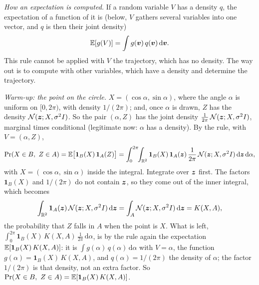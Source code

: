 \emph{How an expectation is computed.} If a random variable $V$ has a
density $q$, the expectation of a function of it is (below, $V$ gathers
several variables into one vector, and $q$ is then their joint density)
\[
  \mathbb{E}[g(V)]=\int g(\bm{v})\,q(\bm{v})\,\mathrm d\bm{v} .
\]
This rule cannot be applied with $V$ the trajectory, which has no
density. The way out is to compute with other variables, which have a
density and determine the trajectory.

\emph{Warm-up: the point on the circle.} $X=(\cos\alpha,\sin\alpha)$,
where the angle $\alpha$ is uniform on $[0,2\pi)$, with density
$1/(2\pi)$; and, once $\alpha$ is drawn, $Z$ has the density
$\mathcal{N}(\bm{z};X,\sigma^2I)$. So the pair $(\alpha,Z)$ has the joint
density $\frac1{2\pi}\,\mathcal{N}(\bm{z};X,\sigma^2I)$, marginal times
conditional (legitimate now: $\alpha$ has a density). By the rule, with
$V=(\alpha,Z)$,
\[
  \Pr(X\in B,\ Z\in A)=\mathbb{E}\bigl[\mathbf 1_B(X)\,\mathbf 1_A(Z)\bigr]
  =\int_0^{2\pi}\!\!\int_{\mathbb{R}^2}\mathbf 1_B(X)\,\mathbf 1_A(\bm{z})\,
   \frac1{2\pi}\,\mathcal{N}(\bm{z};X,\sigma^2I)\,\mathrm d\bm{z}\,
   \mathrm d\alpha ,
\]
with $X=(\cos\alpha,\sin\alpha)$ inside the integral. Integrate over
$\bm{z}$ first. The factors $\mathbf 1_B(X)$ and $1/(2\pi)$ do not
contain $\bm{z}$, so they come out of the inner integral, which becomes
\[
  \int_{\mathbb{R}^2}\mathbf 1_A(\bm{z})\,\mathcal{N}(\bm{z};X,\sigma^2I)\,
  \mathrm d\bm{z}=\int_A\mathcal{N}(\bm{z};X,\sigma^2I)\,\mathrm d\bm{z}
  =K(X,A),
\]
the probability that $Z$ falls in $A$ when the point is $X$. What is
left, $\int_0^{2\pi}\mathbf 1_B(X)\,K(X,A)\,\frac1{2\pi}\,\mathrm d\alpha$,
is by the rule again the expectation $\mathbb{E}[\mathbf 1_B(X)\,K(X,A)]$: it is
$\int g(\alpha)\,q(\alpha)\,\mathrm d\alpha$ with $V=\alpha$, the function
$g(\alpha)=\mathbf 1_B(X)\,K(X,A)$, and $q(\alpha)=1/(2\pi)$ the density of
$\alpha$; the factor $1/(2\pi)$ is that density, not an extra factor. So
$\Pr(X\in B,\ Z\in A)=\mathbb{E}[\mathbf 1_B(X)\,K(X,A)]$.


